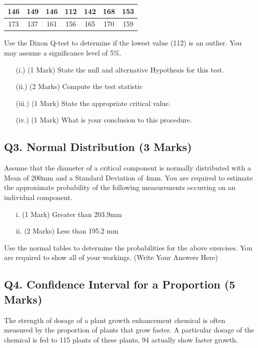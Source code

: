 \documentclass[a4paper,12pt]{article}
\begin{document}
\begin{center}
	\begin{tabular}{|c|c|c|c|c|c|c|}
		\hline
		146 &149  & 146 & 112 & 142 & 168& 153\\ \hline
		173 & 137 & 161 & 156& 165&  170&  159
		\\ \hline
	\end{tabular}
\end{center}
Use the Dixon Q-test to determine if the lowest value (112) is an outlier. You may assume a significance level of 5\%.
\begin{itemize}
	\item[(i.)](1 Mark)	State the null and alternative Hypothesis for this test.
	\item[(ii.)](2 Marks) Compute the test statistic
	\item[(iii.)](1 Mark) State the appropriate critical value.
	\item[(iv.)](1 Mark) What is your conclusion to this procedure.
\end{itemize}
\newpage



\subsection*{Q3. Normal Distribution (3 Marks)} %
Assume that the diameter of a critical component is normally distributed with a Mean of 200mm and a Standard Deviation of 4mm. You are required  to estimate the approximate probability of the following measurements occurring on an individual component.
\begin{itemize}
	\item[i.](1 Mark)	Greater than 203.9mm
	\item[ii.](2 Marks) Less than 195.2 mm
\end{itemize}
\bigskip
\noindent Use the normal tables to determine the probabilities for the above exercises. You are required to show all of your workings.
\newpage
(Write Your Answers Here)
\newpage
\vspace{0.25cm}

\subsection*{Q4. Confidence Interval for a Proportion (5 Marks)}
The strength of dosage of a plant growth enhancement chemical is often measured by the proportion of plants that grow faster. A particular dosage of the chemical is fed to 115 plants of these plants, 94 actually show faster growth.
\end{document}
